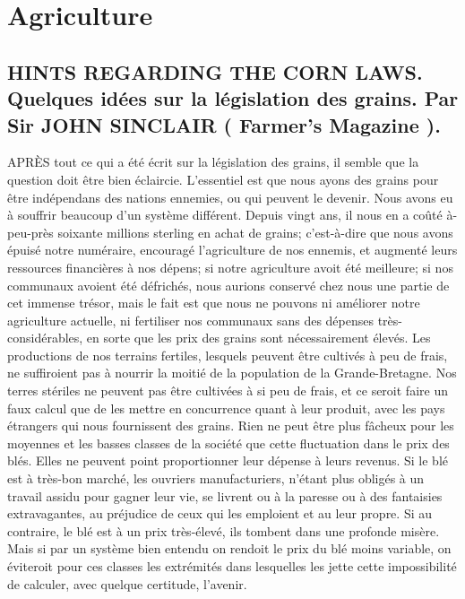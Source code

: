 \setcounter{page}{331}
\chapter{Agriculture}
\section{HINTS REGARDING THE CORN LAWS. Quelques idées sur la législation des grains. Par Sir JOHN SINCLAIR ( Farmer's Magazine ).}
APRÈS tout ce qui a été écrit sur la législation des grains, il semble que la question doit être bien éclaircie.
L'essentiel est que nous ayons des grains pour être indépendans des nations ennemies, ou qui peuvent le devenir. Nous avons eu à souffrir beaucoup d'un système différent. Depuis vingt ans, il nous en a coûté à-peu-près soixante millions sterling en achat de grains; c'est-à-dire que nous avons épuisé notre numéraire, encouragé l'agriculture de nos ennemis, et augmenté leurs ressources financières à nos dépens; si notre agriculture avoit été meilleure; si nos communaux avoient été défrichés, nous aurions conservé chez nous une partie de cet immense trésor, mais le fait est que nous ne pouvons ni améliorer notre agriculture actuelle, ni fertiliser nos communaux sans des dépenses très-considérables, en sorte que les prix\setcounter{page}{332} des grains sont nécessairement élevés. Les productions de nos terrains fertiles, lesquels peuvent être cultivés à peu de frais, ne suffiroient pas à nourrir la moitié de la population de la Grande-Bretagne. Nos terres stériles ne peuvent pas être cultivées à si peu de frais, et ce seroit faire un faux calcul que de les mettre en concurrence quant à leur produit, avec les pays étrangers qui nous fournissent des grains.
Rien ne peut être plus fâcheux pour les moyennes et les basses classes de la société que cette fluctuation dans le prix des blés. Elles ne peuvent point proportionner leur dépense à leurs revenus. Si le blé est à très-bon marché, les ouvriers manufacturiers, n’étant plus obligés à un travail assidu pour gagner leur vie, se livrent ou à la paresse ou à des fantaisies extravagantes, au préjudice de ceux qui les emploient et au leur propre. Si au contraire, le blé est à un prix très-élevé, ils tombent dans une profonde misère. Mais si par un système bien entendu on rendoit le prix du blé moins variable, on éviteroit pour ces classes les extrémités dans lesquelles les jette cette impossibilité de calculer, avec quelque certitude, l’avenir.
